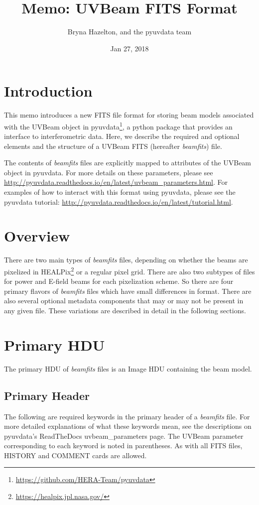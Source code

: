 \documentclass[11pt, oneside]{article}   	%
\title{Memo: UVBeam FITS Format}
\author{Bryna Hazelton, and the pyuvdata team}
\date{Jan 27, 2018}							%
\begin{document}
\maketitle
\section{Introduction}
This memo introduces a new FITS file format for storing
beam models associated with the UVBeam object in
pyuvdata\footnote{\url{https://github.com/HERA-Team/pyuvdata}}, a python package that
provides an interface to interferometric data. Here, we describe the required and optional elements
and the structure of a UVBeam FITS (hereafter \textit{beamfits}) file. 

The contents of \textit{beamfits} files are explicitly mapped to attributes of the UVBeam object in 
pyuvdata. For more details on these parameters, please see 
\url{http://pyuvdata.readthedocs.io/en/latest/uvbeam_parameters.html}.
For examples of how to interact with this format using pyuvdata, please see the
pyuvdata tutorial: \url{http://pyuvdata.readthedocs.io/en/latest/tutorial.html}.

\section{Overview}
There are two main types of \textit{beamfits} files, depending on whether the beams are 
pixelized in HEALPix\footnote{\url{https://healpix.jpl.nasa.gov/}} or a regular pixel grid. There are also two subtypes of files for power 
and E-field beams for each pixelization scheme. So there are four primary flavors of 
\textit{beamfits} files which have small differences in format. There are also several optional 
metadata components that may or may not be present in any given file. These variations are 
described in detail in the following sections.

\section{Primary HDU}
The primary HDU of \textit{beamfits} files is an Image HDU containing the beam model.

\subsection{Primary Header}
The following are required keywords in the primary header of a  \textit{beamfits} file. For more detailed explanations 
of what these keywords mean, see the descriptions on pyuvdata's ReadTheDocs uvbeam\_parameters page. 
The UVBeam parameter corresponding to each keyword is noted in parentheses.
As with all FITS files, HISTORY and COMMENT cards are allowed.
\end{document}
